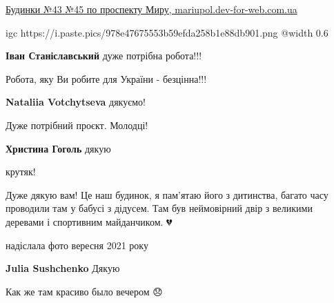  
 
 
 
 

\qqSecCmt


\href{https://mariupol.dev-for-web.com.ua/%D0%B1%D1%83%D0%B4%D0%B8%D0%BD%D0%BA%D0%B8-%E2%84%9643-%E2%84%9645-%D0%BF%D0%BE-%D0%BF%D1%80%D0%BE%D1%81%D0%BF%D0%B5%D0%BA%D1%82%D1%83-%D0%BC%D0%B8%D1%80%D1%83/}{
Будинки №43 №45 по проспекту Миру, mariupol.dev-for-web.com.ua%
}

\ifcmt
  igc https://i.paste.pics/978e47675553b59efda258b1e88db901.png
	@width 0.6
\fi

\begin{itemize} %
\textbf{Іван Станіславський} дуже потрібна робота!!!


Робота, яку Ви робите для України - безцінна!!!

\textbf{Nataliia Votchytseva} дякуємо!
\end{itemize} %



Дуже потрібний проєкт. Молодці!

\textbf{Христина Гоголь} дякую


крутяк!


Дуже дякую вам! Це наш будинок, я пам'ятаю його з дитинства, багато часу
проводили там у бабусі з дідусем. Там був неймовірний двір з великими деревами
і спортивним майданчиком. 💔


надіслала фото вересня 2021 року

\begin{itemize} %
\textbf{Julia Sushchenko} Дякую

Как же там красиво было вечером 😞

\end{itemize} %


